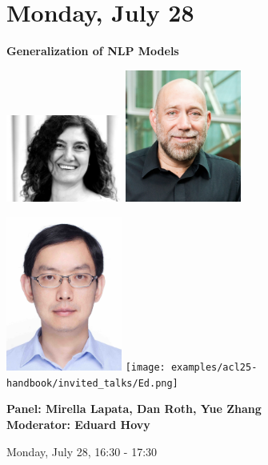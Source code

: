 \section{Monday, July 28}
\vspace*{0.2cm}

\begin{center}
    {\Large \textbf{Generalization of NLP Models}}
    
    \includegraphics[width=1.5in]{examples/acl25-handbook/invited_talks/Mirella.jpg}
    \includegraphics[width=1.5in]{examples/acl25-handbook/invited_talks/dan.jpg}

    \includegraphics[width=1.5in]{examples/acl25-handbook/invited_talks/Yue.jpg}
    \texttt{[image: examples/acl25-handbook/invited\_talks/Ed.png]}
    
    {\large \textbf{Panel: Mirella Lapata, Dan Roth, Yue Zhang}}\\
    {\large \textbf{Moderator: Eduard Hovy}}

    Monday, July 28, 16:30 - 17:30
\end{center}

